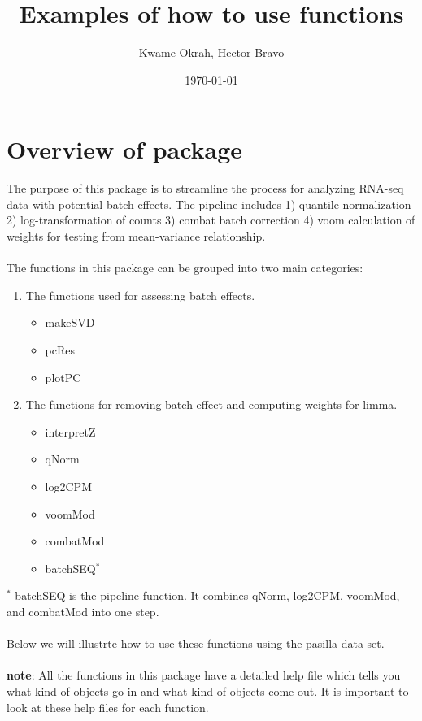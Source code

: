 \documentclass{article}
\title{Examples of how to use functions}
\author{Kwame Okrah, Hector Bravo}
\date{\today}
\begin{document}

\maketitle

\section{Overview of package}
The purpose of this package is to streamline the process for analyzing RNA-seq data
with potential batch effects. The pipeline includes 1) quantile normalization 2) log-transformation of counts 3) combat batch correction 4) voom calculation of weights for testing from mean-variance relationship.\\\\
The functions in this package can be grouped into two main categories:

\begin{enumerate}
\item The functions used for assessing batch effects.
    \begin{itemize}
    \item makeSVD
    \item pcRes
    \item plotPC
    \end{itemize}
\item The functions for removing batch effect and computing weights for limma.
    \begin{itemize}
    \item interpretZ
    \item qNorm
    \item log2CPM
    \item voomMod
    \item combatMod
    \item batchSEQ$^*$
    \end{itemize}
\end{enumerate}
$^*$ batchSEQ is the pipeline function. It combines qNorm, log2CPM, voomMod, and combatMod
into one step.\\\\
Below we will illustrte how to use these functions using the pasilla data set.\\\\
{\bf note}: All the functions in this package have a detailed help file which tells you
what kind of objects go in and what kind of objects come out. It is important to look
at these help files for each function.
\end{document}

